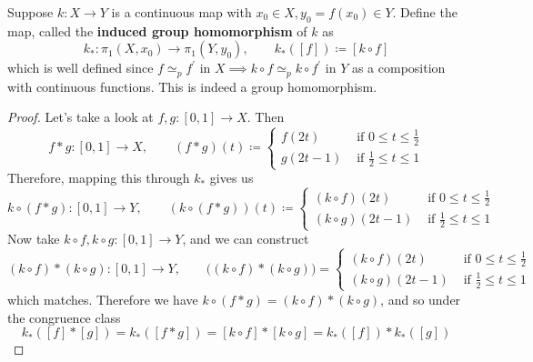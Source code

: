   \begin{definition}
    Suppose $k: X \to Y$ is a continuous map with $x_0 \in X, y_0 = f(x_0) \in Y$. Define the map, called the \textbf{induced group homomorphism} of $k$ as 
    \begin{equation}
      k_\ast : \pi_1 (X, x_0) \to \pi_1 (Y, y_0), \qquad k_\ast ([f]) \coloneqq [k \circ f] 
    \end{equation}
    which is well defined since $f \simeq_p f^\prime$ in $X \implies k \circ f \simeq_p k \circ f^\prime$ in $Y$ as a composition with continuous functions. This is indeed a group homomorphism. 
  \end{definition}
  \begin{proof}
    Let's take a look at $f, g: [0, 1] \to X$. Then 
    \begin{equation}
      f \ast g : [0, 1] \to X, \qquad (f \ast g)(t) \coloneqq 
      \begin{cases} 
        f(2t)  & \text{ if } 0 \leq t \leq \frac{1}{2} \\ 
        g(2t - 1) & \text{ if } \frac{1}{2} \leq t \leq 1
      \end{cases}
    \end{equation}
    Therefore, mapping this through $k_\ast$ gives us 
    \begin{equation}
      k \circ (f \ast g) : [0, 1] \to Y, \qquad (k \circ (f \ast g)) (t) \coloneqq
      \begin{cases} 
        (k \circ f)(2t)  & \text{ if } 0 \leq t \leq \frac{1}{2} \\ 
        (k \circ g)(2t - 1) & \text{ if } \frac{1}{2} \leq t \leq 1
      \end{cases}
    \end{equation}
    Now take $k \circ f, k \circ g: [0, 1] \to Y$, and we can construct 
    \begin{equation}
      (k \circ f) \ast (k \circ g) : [0, 1] \to Y, \qquad \big( (k \circ f) \ast (k \circ g) \big) = \begin{cases} 
        (k \circ f) (2t) & \text{ if } 0 \leq t \leq \frac{1}{2} \\ 
        (k \circ g) (2t - 1) & \text{ if } \frac{1}{2} \leq t \leq 1
      \end{cases}
    \end{equation}
    which matches. Therefore we have $k \circ (f \ast g) = (k \circ f) \ast (k \circ g)$, and so under the congruence class 
    \begin{equation}
      k_\ast ([f] \ast [g]) = k_\ast([f \ast g]) = [k \circ f] \ast [k \circ g] = k_\ast ([f]) \ast k_\ast ([g]) 
    \end{equation}
  \end{proof}

